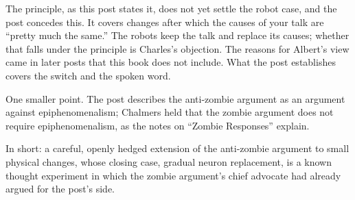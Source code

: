 \begin{afterword}
The principle, as this post states it, does not yet settle the robot case, and the post concedes this. It covers changes after which the causes of your talk are ``pretty much the same.'' The robots keep the talk and replace its causes; whether that falls under the principle is Charles's objection. The reasons for Albert's view came in later posts that this book does not include. What the post establishes covers the switch and the spoken word.

One smaller point. The post describes the anti-zombie argument as an argument against epiphenomenalism; Chalmers held that the zombie argument does not require epiphenomenalism, as the notes on ``Zombie Responses'' explain.

In short: a careful, openly hedged extension of the anti-zombie argument to small physical changes, whose closing case, gradual neuron replacement, is a known thought experiment in which the zombie argument's chief advocate had already argued for the post's side.
\end{afterword}
